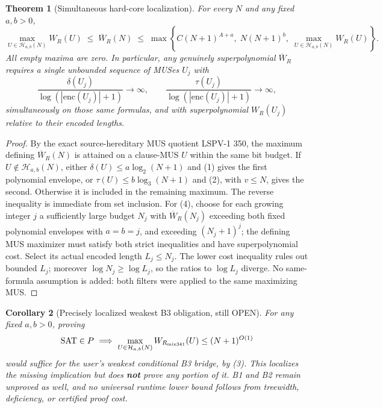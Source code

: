 \documentclass[11pt]{article}
\newtheorem{theorem}{Theorem}
\newtheorem{corollary}[theorem]{Corollary}
\begin{document}
\begin{theorem}[Simultaneous hard-core localization]
For every $N$ and any fixed $a,b>0$,
\[
\boxed{
\max_{U\in\mathcal H_{a,b}(N)}W_R(U)
\;\le\;\overline W_R(N)
\;\le\;
\max\!\left\{
C(N+1)^{A+a},\;
N(N+1)^b,\;
\max_{U\in\mathcal H_{a,b}(N)}W_R(U)
\right\}.
}
\tag{3}
\]
All empty maxima are zero. In particular, any genuinely superpolynomial $\overline W_R$ requires a single unbounded sequence of MUSes $U_j$ with
\[
\frac{\delta(U_j)}{\log(|\mathrm{enc}(U_j)|+1)}\longrightarrow\infty,\qquad
\frac{\tau(U_j)}{\log(|\mathrm{enc}(U_j)|+1)}\longrightarrow\infty,
\tag{4}
\]
\emph{simultaneously on those same formulas}, and with superpolynomial $W_R(U_j)$ relative to their encoded lengths.
\end{theorem}
\begin{proof}
By the exact source-hereditary MUS quotient LSPV-1 350, the maximum defining $\overline W_R(N)$ is attained on a clause-MUS $U$ within the same bit budget. If $U\notin\mathcal H_{a,b}(N)$, either $\delta(U)\le a\log_2(N+1)$ and (1) gives the first polynomial envelope, or $\tau(U)\le b\log_3(N+1)$ and (2), with $v\le N$, gives the second. Otherwise it is included in the remaining maximum. The reverse inequality is immediate from set inclusion. For (4), choose for each growing integer $j$ a sufficiently large budget $N_j$ with $\overline W_R(N_j)$ exceeding both fixed polynomial envelopes with $a=b=j$, and exceeding $(N_j+1)^j$; the defining MUS maximizer must satisfy both strict inequalities and have superpolynomial cost. Select its actual encoded length $L_j\le N_j$. The lower cost inequality rules out bounded $L_j$; moreover $\log N_j\ge\log L_j$, so the ratios to $\log L_j$ diverge. No same-formula assumption is added: both filters were applied to the same maximizing MUS.
\end{proof}

\begin{corollary}[Precisely localized weakest B3 obligation, still OPEN]
For any fixed $a,b>0$, proving
\[
{\rm SAT}\in P\ \Longrightarrow\
\max_{U\in\mathcal H_{a,b}(N)} W_{R_{\rm mix341}}(U)
\le (N+1)^{O(1)}
\]
would suffice for the user's weakest conditional B3 bridge, by (3). This \emph{localizes} the missing implication but does \textbf{not} prove any portion of it. B1 and B2 remain unproved as well, and no universal runtime lower bound follows from treewidth, deficiency, or certified proof cost.
\end{corollary}
\end{document}
